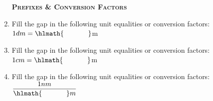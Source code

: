 \documentclass[main.tex]{subfiles}
\begin{document}
\begin{multicols*}{2}
\begin{enumerate}
{\raggedright\textsc{\textbf{Prefixes \& Conversion Factors }}\par}

\item Fill the gap in the following unit equalities or conversion factors:
$1dm=\hlmath{\hspace{35pt }}$m
\begin{enumerate}[label=(\alph*)]
\end{enumerate}
\item Fill the gap in the following unit equalities or conversion factors:
$1cm=\hlmath{\hspace{35pt }}$m
\begin{enumerate}[label=(\alph*)]
\end{enumerate}


\item Fill the gap in the following unit equalities or conversion factors:
$\dfrac{1nm}{\hlmath{\hspace{35pt }}m}$
\begin{enumerate}[label=(\alph*)]
\end{enumerate}


\end{enumerate}
\end{multicols*}
\end{document}
